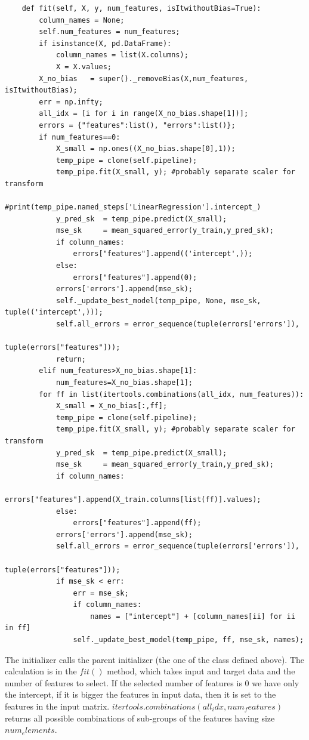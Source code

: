 \documentclass[12pt, letterpaper]{article}
\theoremstyle{definition}
\begin{document}
\begin{lstlisting}
    def fit(self, X, y, num_features, isItwithoutBias=True):
        column_names = None;
        self.num_features = num_features;
        if isinstance(X, pd.DataFrame):
            column_names = list(X.columns);
            X = X.values;
        X_no_bias   = super()._removeBias(X,num_features, isItwithoutBias);
        err = np.infty;
        all_idx = [i for i in range(X_no_bias.shape[1])];
        errors = {"features":list(), "errors":list()};
        if num_features==0:
            X_small = np.ones((X_no_bias.shape[0],1));
            temp_pipe = clone(self.pipeline); 
            temp_pipe.fit(X_small, y); #probably separate scaler for transform
            #print(temp_pipe.named_steps['LinearRegression'].intercept_)
            y_pred_sk  = temp_pipe.predict(X_small);
            mse_sk     = mean_squared_error(y_train,y_pred_sk);
            if column_names:
                errors["features"].append(('intercept',));
            else:
                errors["features"].append(0);
            errors['errors'].append(mse_sk);
            self._update_best_model(temp_pipe, None, mse_sk, tuple(('intercept',)));
            self.all_errors = error_sequence(tuple(errors['errors']),
                                             tuple(errors["features"]));
            return;
        elif num_features>X_no_bias.shape[1]:
            num_features=X_no_bias.shape[1];
        for ff in list(itertools.combinations(all_idx, num_features)):
            X_small = X_no_bias[:,ff]; 
            temp_pipe = clone(self.pipeline); 
            temp_pipe.fit(X_small, y); #probably separate scaler for transform
            y_pred_sk  = temp_pipe.predict(X_small);
            mse_sk     = mean_squared_error(y_train,y_pred_sk);
            if column_names:
                errors["features"].append(X_train.columns[list(ff)].values);
            else:
                errors["features"].append(ff);
            errors['errors'].append(mse_sk);
            self.all_errors = error_sequence(tuple(errors['errors']),
                                             tuple(errors["features"]));
            if mse_sk < err:
                err = mse_sk;
                if column_names:
                    names = ["intercept"] + [column_names[ii] for ii in ff]
                self._update_best_model(temp_pipe, ff, mse_sk, names);
\end{lstlisting}
The initializer calls the parent initializer (the one of the class defined above). The calculation is in the $fit()$ method, which takes input and target data and the number of features to select. If the selected number of features is $0$ we have only the intercept, if it is bigger the features in input data, then it is set to the features in the input matrix. $itertools.combinations(all_idx, num_features)$ returns all possible combinations of sub-groups of the features having size $num_elements$. 
\end{document}
